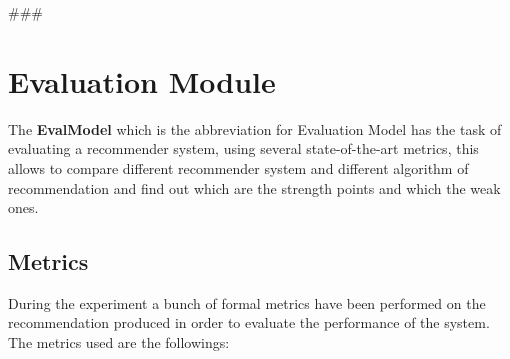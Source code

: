 
\usepackage{comment}


###

\section{Evaluation Module}\label{sec:eva-module}
The \textbf{EvalModel} which is the abbreviation for Evaluation Model has the task of evaluating a recommender system,
using several state-of-the-art metrics, this allows to compare different recommender system and different algorithm of
recommendation and find out which are the strength points and which the weak ones.

\subsection{Metrics}\label{subsec:metrics}
During the experiment a bunch of formal metrics have been performed on the recommendation produced in order to evaluate
the performance of the system.
The metrics used are the followings:
\hfill\break
\hfill\break

